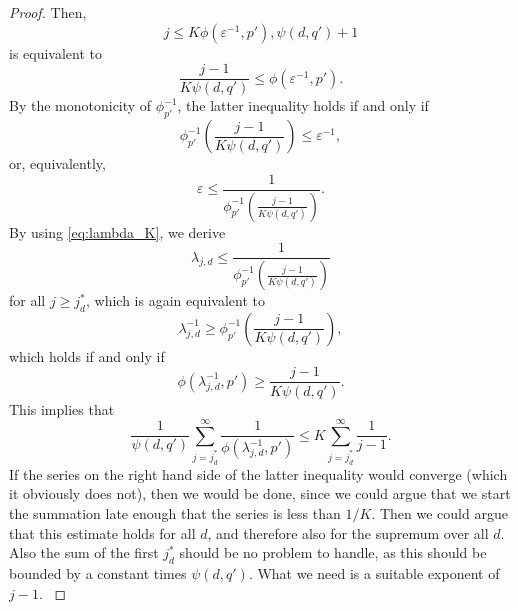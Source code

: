 \documentclass{article}
\theoremstyle{definition}
\begin{document}
\begin{proof}
{Then, 
\[
j \le K \phi(\varepsilon^{-1},p'),\psi(d,q') +1
\]
is equivalent to
\[
\frac{j-1}{K \psi(d,q')} \le \phi(\varepsilon^{-1},p').
\]
By the monotonicity of $\phi_{p'}^{-1}$, the latter inequality holds if and only if
\[
  \phi_{p'}^{-1} \left(\frac{j-1}{K \psi(d,q')} \right)
  \le \varepsilon^{-1},
\]
or, equivalently,
\[
 \varepsilon \le \frac{1}{\phi_{p'}^{-1} \left(\frac{j-1}{K \psi(d,q')} \right)}.
\]
By using \eqref{eq:lambda_K}, we derive
\[
 \lambda_{j,d}\le \frac{1}{\phi_{p'}^{-1} \left(\frac{j-1}{K \psi(d,q')} \right)}
\]
for all $j\ge j_d^*$, which is again equivalent to 
\[
\lambda_{j,d}^{-1}\ge \phi_{p'}^{-1} \left(\frac{j-1}{K \psi(d,q')} \right),
\]
which holds if and only if
\[ 
 \phi (\lambda_{j,d}^{-1}, p') \ge \frac{j-1}{K \psi(d,q')}.
\]
This implies that 
\[
\frac{1}{\psi(d,q')} \sum_{j=j_d^*}^\infty \frac{1}{\phi (\lambda_{j,d}^{-1}, p')} \le K \sum_{j=j_d^*}^\infty \frac{1}{j-1}.
\]
If the series on the right hand side of the latter inequality would converge (which it obviously does not), then we would be done, since we could argue that we start the summation late enough that the series is less than $1/K$. Then we could argue that this estimate holds for all $d$, and therefore also for the supremum over all $d$. Also the sum of the first $j_d^*$ should be no problem to handle, as this should be bounded by a constant times $\psi (d,q')$.
What we need is a suitable exponent of $j-1$.
}
\end{proof}

\bigskip
\end{document}
